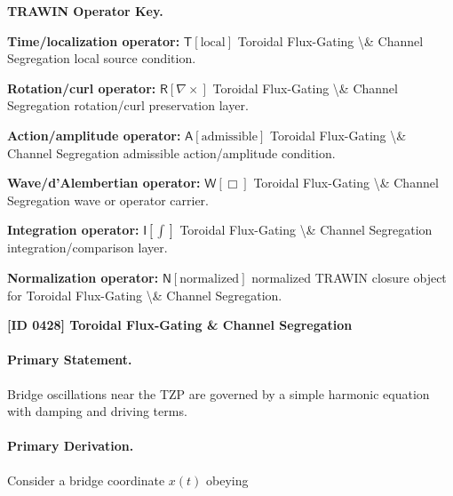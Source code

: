 \par\vspace{0.45\baselineskip}
\noindent\begin{minipage}[t]{\linewidth}
\begingroup
\small
\raggedright
\textbf{TRAWIN Operator Key.}\par
\noindent\textbf{Time/localization operator:} $\mathsf{T}\!\left[\mathrm{local}\right]$ Toroidal Flux-Gating \textbackslash{}\& Channel Segregation local source condition.\par
\noindent\textbf{Rotation/curl operator:} $\mathsf{R}\!\left[\nabla\times\right]$ Toroidal Flux-Gating \textbackslash{}\& Channel Segregation rotation/curl preservation layer.\par
\noindent\textbf{Action/amplitude operator:} $\mathsf{A}\!\left[\mathrm{admissible}\right]$ Toroidal Flux-Gating \textbackslash{}\& Channel Segregation admissible action/amplitude condition.\par
\noindent\textbf{Wave/d'Alembertian operator:} $\mathsf{W}\!\left[\Box\right]$ Toroidal Flux-Gating \textbackslash{}\& Channel Segregation wave or operator carrier.\par
\noindent\textbf{Integration operator:} $\mathsf{I}\!\left[\int\right]$ Toroidal Flux-Gating \textbackslash{}\& Channel Segregation integration/comparison layer.\par
\noindent\textbf{Normalization operator:} $\mathsf{N}\!\left[\mathrm{normalized}\right]$ normalized TRAWIN closure object for Toroidal Flux-Gating \textbackslash{}\& Channel Segregation.\par
\endgroup
\end{minipage}

\clearpage
\noindent\textbf{[ID 0428] Toroidal Flux-Gating \& Channel Segregation}\par
\vspace{0.35em}
\paragraph{Primary Statement.}

Bridge oscillations near the TZP are governed by a simple harmonic equation with damping and driving terms.

\paragraph{Primary Derivation.}

Consider a bridge coordinate $x(t)$ obeying

